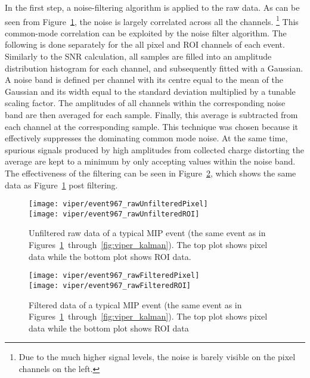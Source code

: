 In the first step, a noise-filtering algorithm is applied to the raw data.
As can be seen from Figure~\ref{fig:viper_unfilteredRawData}, the noise is largely correlated across all the channels.
\footnote{Due to the much higher signal levels, the noise is barely visible on the pixel channels on the left.}
This common-mode correlation can be exploited by the noise filter algorithm.
The following is done separately for the all pixel and ROI channels of each event.
Similarly to the SNR calculation, all samples are filled into an amplitude distribution histogram for each channel, and subsequently fitted with a Gaussian.
A noise band is defined per channel with its centre equal to the mean of the Gaussian and its width equal to the standard deviation multiplied by a tunable scaling factor.
The amplitudes of all channels within the corresponding noise band are then averaged for each sample.
Finally, this average is subtracted from each channel at the corresponding sample.
This technique was chosen because it effectively suppresses the dominating common mode noise.
At the same time, spurious signals produced by high amplitudes from collected charge distorting the average are kept to a minimum by only accepting values within the noise band.
The effectiveness of the filtering can be seen in Figure~\ref{fig:viper_filteredRawData}, which shows the same data as Figure~\ref{fig:viper_unfilteredRawData} post filtering.

\begin{figure}[htb]
	\centering
	\texttt{[image: viper/event967\_rawUnfilteredPixel]}\\
	\texttt{[image: viper/event967\_rawUnfilteredROI]}
	\caption{Unfiltered raw data of a typical MIP event (the same event as in Figures~\ref{fig:viper_unfilteredRawData}~through~\ref{fig:viper_kalman}). The top plot shows pixel data while the bottom plot shows ROI data.}
	\label{fig:viper_unfilteredRawData}
\end{figure}

\begin{figure}[htb]
	\centering
	\texttt{[image: viper/event967\_rawFilteredPixel]}\\
	\texttt{[image: viper/event967\_rawFilteredROI]}
	\caption{Filtered data of a typical MIP event (the same event as in Figures~\ref{fig:viper_unfilteredRawData}~through~\ref{fig:viper_kalman}).
	The top plot shows pixel data while the bottom plot shows ROI data}
	\label{fig:viper_filteredRawData}
\end{figure}

